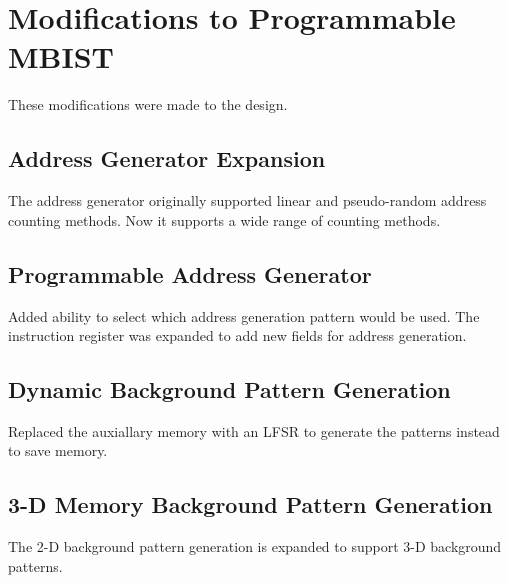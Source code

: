 \section{Modifications to Programmable MBIST}
\label{sect:bg-modifications}
These modifications were made to the design.

\subsection{Address Generator Expansion}
The address generator originally supported linear and pseudo-random address counting methods.  Now it supports a wide range of counting methods.

\subsection{Programmable Address Generator}
Added ability to select which address generation pattern would be used.  The instruction register was expanded to add new fields for address generation.

\subsection{Dynamic Background Pattern Generation}
Replaced the auxiallary memory with an LFSR to generate the patterns instead to save memory.

\subsection{3-D Memory Background Pattern Generation}
The 2-D background pattern generation is expanded to support 3-D background patterns.

